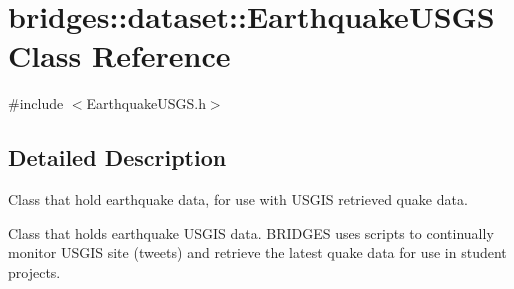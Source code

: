 \hypertarget{classbridges_1_1dataset_1_1_earthquake_u_s_g_s}{}\section{bridges\+:\+:dataset\+:\+:Earthquake\+U\+S\+GS Class Reference}
\label{classbridges_1_1dataset_1_1_earthquake_u_s_g_s}


{\ttfamily \#include $<$Earthquake\+U\+S\+G\+S.\+h$>$}



\subsection{Detailed Description}
Class that hold earthquake data, for use with U\+S\+G\+IS retrieved quake data. 

Class that holds earthquake U\+S\+G\+IS data. B\+R\+I\+D\+G\+ES uses scripts to continually monitor U\+S\+G\+IS site (tweets) and retrieve the latest quake data for use in student projects.

